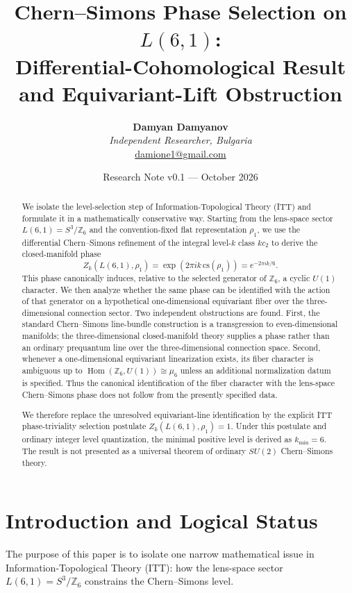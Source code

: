 \documentclass[11pt,a4paper]{article}
\title{\textbf{Chern--Simons Phase Selection on $L(6,1)$:}\\
\textbf{Differential-Cohomological Result and Equivariant-Lift Obstruction}}
\author{\textbf{Damyan Damyanov}\\
\small\textit{Independent Researcher, Bulgaria}\\
\small\href{mailto:damione1@gmail.com}{damione1@gmail.com}}
\date{Research Note v0.1 --- October 2026}
\begin{document}
\maketitle

\begin{abstract}
We isolate the level-selection step of Information-Topological Theory (ITT) and formulate it in a mathematically conservative way. Starting from the lens-space sector $L(6,1)=S^3/\mathbb Z_6$ and the convention-fixed flat representation $\rho_1$, we use the differential Chern--Simons refinement of the integral level-$k$ class $k c_2$ to derive the closed-manifold phase
\[
Z_k(L(6,1),\rho_1)=\exp\!\left(2\pi i k\,\mathrm{cs}(\rho_1)\right)=e^{-2\pi i k/6}.
\]
This phase canonically induces, relative to the selected generator of $\mathbb Z_6$, a cyclic $U(1)$ character. We then analyze whether the same phase can be identified with the action of that generator on a hypothetical one-dimensional equivariant fiber over the three-dimensional connection sector. Two independent obstructions are found. First, the standard Chern--Simons line-bundle construction is a transgression to even-dimensional manifolds; the three-dimensional closed-manifold theory supplies a phase rather than an ordinary prequantum line over the three-dimensional connection space. Second, whenever a one-dimensional equivariant linearization exists, its fiber character is ambiguous up to $\operatorname{Hom}(\mathbb Z_6,U(1))\cong\mu_6$ unless an additional normalization datum is specified. Thus the canonical identification of the fiber character with the lens-space Chern--Simons phase does not follow from the presently specified data.

We therefore replace the unresolved equivariant-line identification by the explicit ITT phase-triviality selection postulate $Z_k(L(6,1),\rho_1)=1$. Under this postulate and ordinary integer level quantization, the minimal positive level is derived as $k_{\min}=6$. The result is not presented as a universal theorem of ordinary $SU(2)$ Chern--Simons theory.
\end{abstract}

\section{Introduction and Logical Status}

The purpose of this paper is to isolate one narrow mathematical issue in Information-Topological Theory (ITT): how the lens-space sector $L(6,1)=S^3/\mathbb Z_6$ constrains the Chern--Simons level.
\end{document}
